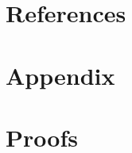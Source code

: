 \documentclass[12pt, a4paper]{elsarticle}
\begin{document}

\section*{References}





\section*{Appendix}
\appendix
\renewcommand*{\thesection}{\Alph{section}}

\section{Proofs}
\label{ap:proofs}
\end{document}
